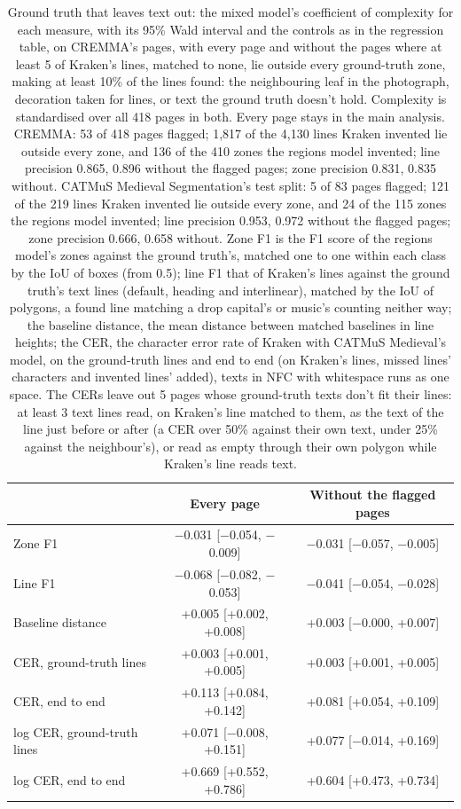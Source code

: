 \begin{table}[htbp]
  \centering
  \caption{Ground truth that leaves text out: the mixed model's coefficient of complexity for each measure, with its 95\% Wald interval and the controls as in the regression table, on CREMMA's pages, with every page and without the pages where at least 5 of Kraken's lines, matched to none, lie outside every ground-truth zone, making at least 10\% of the lines found: the neighbouring leaf in the photograph, decoration taken for lines, or text the ground truth doesn't hold. Complexity is standardised over all 418 pages in both. Every page stays in the main analysis. CREMMA: 53 of 418 pages flagged; 1,817 of the 4,130 lines Kraken invented lie outside every zone, and 136 of the 410 zones the regions model invented; line precision 0.865, 0.896 without the flagged pages; zone precision 0.831, 0.835 without. CATMuS Medieval Segmentation's test split: 5 of 83 pages flagged; 121 of the 219 lines Kraken invented lie outside every zone, and 24 of the 115 zones the regions model invented; line precision 0.953, 0.972 without the flagged pages; zone precision 0.666, 0.658 without. Zone F1 is the F1 score of the regions model's zones against the ground truth's, matched one to one within each class by the IoU of boxes (from 0.5); line F1 that of Kraken's lines against the ground truth's text lines (default, heading and interlinear), matched by the IoU of polygons, a found line matching a drop capital's or music's counting neither way; the baseline distance, the mean distance between matched baselines in line heights; the CER, the character error rate of Kraken with CATMuS Medieval's model, on the ground-truth lines and end to end (on Kraken's lines, missed lines' characters and invented lines' added), texts in NFC with whitespace runs as one space. The CERs leave out 5 pages whose ground-truth texts don't fit their lines: at least 3 text lines read, on Kraken's line matched to them, as the text of the line just before or after (a CER over 50\% against their own text, under 25\% against the neighbour's), or read as empty through their own polygon while Kraken's line reads text.}
  \label{tab:difficulty_ground_truth_coverage}
  \begin{tabular}{lcc}
    \toprule
     & Every page & Without the flagged pages \\
    \midrule
    Zone F1 & $-$0.031 [$-$0.054, $-$0.009] & $-$0.031 [$-$0.057, $-$0.005] \\
    Line F1 & $-$0.068 [$-$0.082, $-$0.053] & $-$0.041 [$-$0.054, $-$0.028] \\
    Baseline distance & +0.005 [+0.002, +0.008] & +0.003 [$-$0.000, +0.007] \\
    CER, ground-truth lines & +0.003 [+0.001, +0.005] & +0.003 [+0.001, +0.005] \\
    CER, end to end & +0.113 [+0.084, +0.142] & +0.081 [+0.054, +0.109] \\
    log CER, ground-truth lines & +0.071 [$-$0.008, +0.151] & +0.077 [$-$0.014, +0.169] \\
    log CER, end to end & +0.669 [+0.552, +0.786] & +0.604 [+0.473, +0.734] \\
    \bottomrule
  \end{tabular}
\end{table}
